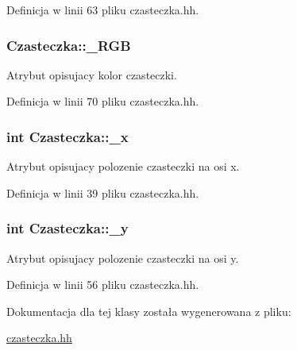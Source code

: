 Definicja w linii 63 pliku czasteczka.\-hh.

\hypertarget{class_czasteczka_ab9c93cfb3cf0360579ad0def2a94178c}{
\subsubsection[{\-\_\-\-R\-G\-B}]{ Czasteczka\-::\-\_\-\-R\-G\-B}}\label{class_czasteczka_ab9c93cfb3cf0360579ad0def2a94178c}
Atrybut opisujacy kolor czasteczki. 

Definicja w linii 70 pliku czasteczka.\-hh.

\hypertarget{class_czasteczka_af809cd4fb1651ebf4b5980ee38c68e58}{
\subsubsection[{\-\_\-x}]{\setlength{\rightskip}{0pt plus 5cm}int Czasteczka\-::\-\_\-x}}\label{class_czasteczka_af809cd4fb1651ebf4b5980ee38c68e58}
Atrybut opisujacy polozenie czasteczki na osi x. 

Definicja w linii 39 pliku czasteczka.\-hh.

\hypertarget{class_czasteczka_a285d25465eee101b6af073809e2fee00}{
\subsubsection[{\-\_\-y}]{\setlength{\rightskip}{0pt plus 5cm}int Czasteczka\-::\-\_\-y}}\label{class_czasteczka_a285d25465eee101b6af073809e2fee00}
Atrybut opisujacy polozenie czasteczki na osi y. 

Definicja w linii 56 pliku czasteczka.\-hh.



Dokumentacja dla tej klasy została wygenerowana z pliku\-:\begin{DoxyCompactItemize}
\item 
\hyperlink{czasteczka_8hh}{czasteczka.\-hh}\end{DoxyCompactItemize}
